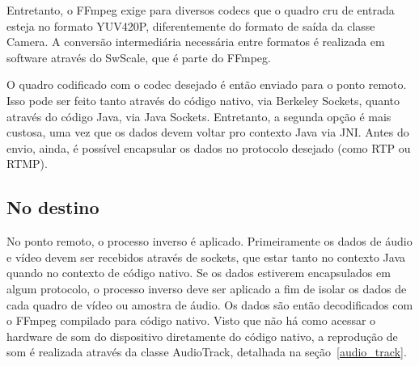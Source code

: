 \documentclass{acm_proc_article-sp}
\begin{document}
Entretanto, o FFmpeg exige para diversos codecs que o quadro cru de entrada esteja no formato YUV420P, diferentemente do formato de saída da classe Camera. A conversão intermediária necessária entre formatos é realizada em software através do SwScale, que é parte do FFmpeg.


O quadro codificado com o codec desejado é então enviado para o ponto remoto. Isso pode ser feito tanto através do código nativo, via Berkeley Sockets, quanto através do código Java, via Java Sockets. Entretanto, a segunda opção é mais custosa, uma vez que os dados devem voltar pro contexto Java via JNI. Antes do envio, ainda, é possível encapsular os dados no protocolo desejado (como RTP ou RTMP).

\subsection{No destino}


No ponto remoto, o processo inverso é aplicado. Primeiramente os dados de áudio e vídeo devem ser recebidos através de sockets, que estar tanto no contexto Java quando no contexto de código nativo. Se os dados estiverem encapsulados em algum protocolo, o processo inverso deve ser aplicado a fim de isolar os dados de cada quadro de vídeo ou amostra de áudio. Os dados são então decodificados com o FFmpeg compilado para código nativo. Visto que não há como acessar o hardware de som do dispositivo diretamente do código nativo, a reprodução de som é realizada através da classe AudioTrack, detalhada na seção~\ref{audio_track}. 
\end{document}
